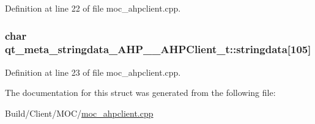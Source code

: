 Definition at line 22 of file moc\+\_\+ahpclient.\+cpp.

\hypertarget{structqt__meta__stringdata___a_h_p_____a_h_p_client__t_aa3cc0abc0beb5400fad54b1b3d149473}{}
\subsubsection[{stringdata}]{\setlength{\rightskip}{0pt plus 5cm}char qt\+\_\+meta\+\_\+stringdata\+\_\+\+A\+H\+P\+\_\+\+\_\+\+A\+H\+P\+Client\+\_\+t\+::stringdata\mbox{[}105\mbox{]}}\label{structqt__meta__stringdata___a_h_p_____a_h_p_client__t_aa3cc0abc0beb5400fad54b1b3d149473}


Definition at line 23 of file moc\+\_\+ahpclient.\+cpp.



The documentation for this struct was generated from the following file\+:\begin{DoxyCompactItemize}
\item 
Build/\+Client/\+M\+O\+C/\hyperlink{moc__ahpclient_8cpp}{moc\+\_\+ahpclient.\+cpp}\end{DoxyCompactItemize}
